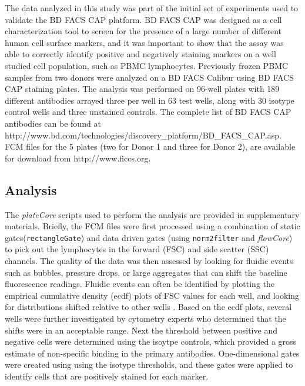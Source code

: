 \documentclass[12pt]{article}
\newcommand{\Robject}[1]{{\texttt{#1}}}
\newcommand{\Rpackage}[1]{{\textit{#1}}}
\begin{document}
The data analyzed in this study was part of the initial set of experiments
used to validate the BD FACS CAP platform. BD FACS CAP was designed as a cell
characterization tool to screen for the presence of a large number of different
human cell surface markers, and it was important to show that the assay was
able to correctly identify positive and negatively staining markers on a well
studied cell population, such as PBMC lymphocytes. Previously
frozen PBMC samples from two donors were analyzed on a BD FACS Calibur using BD
FACS CAP staining plates. The analysis was performed on 96-well plates with 189
different antibodies arrayed three per well in 63 test wells, along with 30
isotype control wells and three unstained controls. The complete list of BD
FACS CAP antibodies can be found at
http://www.bd.com/technologies/discovery\_platform/BD\_FACS\_CAP.asp. FCM files
for the 5 plates (two for Donor 1 and three for Donor 2), are available for
download from http://www.ficcs.org.

\subsection*{Analysis}

The \Rpackage{plateCore}
scripts used to perform the analysis are provided in supplementary materials.
Briefly, the FCM files were first processed using a combination of static
gates(\Robject{rectangleGate}) and data driven gates (using
\Robject{norm2filter} and \Rpackage{flowCore}) to pick out the lymphocytes in
the forward (FSC) and side scatter (SSC) channels.  The
quality of the data was then assessed by looking for fluidic events such as
bubbles, pressure drops, or large aggregates that can shift the baseline
fluorescence readings. Fluidic events can often be identified by plotting the
empirical cumulative density (ecdf) plots of FSC values for each well, and
looking for distributions shifted relative to other wells \citep{lemeur2007}.
Based on the ecdf plots, several wells were further investigated by cytometry
experts who determined that the shifts were in an acceptable range. Next the
threshold between positive and negative cells were determined using the isoytpe
controls, which provided a gross estimate of non-specific binding in the
primary antibodies. One-dimensional gates were created using using the isotype
thresholds, and these gates were applied to identify cells that are positively
stained for each marker.
\end{document}
